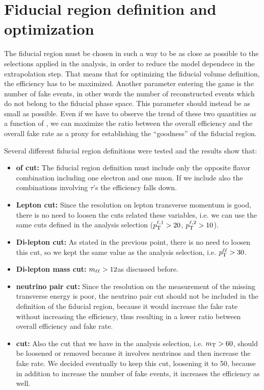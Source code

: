\chapter{Fiducial region definition and optimization}
\label{app:fiducial_region}

The fiducial region must be chosen in such a way to be as close as possible to the selections applied in the analysis, in order to reduce the model dependece in the extrapolation step. That means that for optimizing the fiducial volume definition, the efficiency has to be maximized. Another parameter entering the game is the number of fake events, in other words the number of reconstructed events which do not belong to the fiducial phase space. This parameter should instead be as small as possible. Even if we have to observe the trend of these two quantities as a function of \pth, we can maximize the ratio between the overall efficiency and the overall fake rate as a proxy for establishing the ``goodness'' of the fiducial region.

Several different fiducial region definitions were tested and the results show that:
\begin{itemize}
\item {\bf of cut:} The fiducial region definition must include only the opposite flavor combination including one electron and one muon. If we include also the combinations involving $\tau$'s the efficiency falls down.
\item {\bf Lepton cut:} Since the resolution on lepton transverse momentum is good, there is no need to loosen the cuts related these variables, i.e. we can use the same cuts defined in the analysis selection ($p_\mathrm{T}^{\ell,1}>20$\GeV, $p_\mathrm{T}^{\ell,2}>10$\GeV).
\item {\bf Di-lepton \pt cut:} As stated in the previous point, there is no need to loosen this cut, so we kept the same value as the analysis selection, i.e. $p_\mathrm{T}^{\ell\ell}>30$\GeV.
\item {\bf Di-lepton mass cut:} $m_{\ell\ell}>12$\GeV as discussed before.
\item {\bf neutrino pair \pt cut:} Since the resolution on the measurement of the missing transverse energy is poor, the neutrino pair cut should not be included in the definition of the fiducial region, because it would increase the fake rate without increasing the efficiency, thus resulting in a lower ratio between overall efficiency and fake rate.
\item {\bf \mt cut:} Also the \mt cut that we have in the analysis selection, i.e. $m_\mathrm{T}>60$\GeV, should be loosened or removed because it involves neutrinos and then increase the fake rate. We decided eventually to keep this cut, loosening it to 50\GeV, because in addition to increase the number of fake events, it increases the efficiency as well.
\end{itemize}

